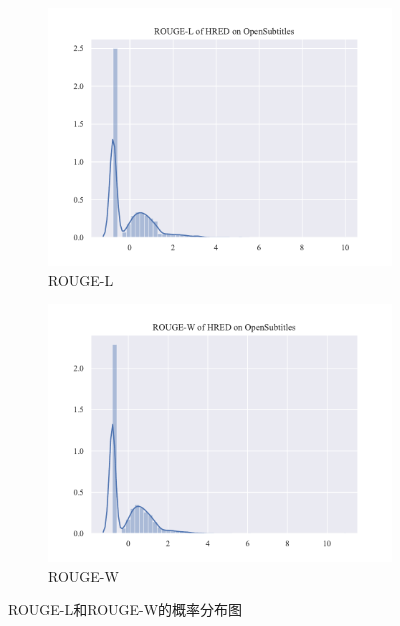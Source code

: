\begin{figure}[H]
    \begin{subfigure}{0.5\linewidth}
        \centering
        \includegraphics[width=\linewidth]{figure/distplot/opensub/hred/rouge_l/plot.pdf}
        \caption{ROUGE-L}
    \end{subfigure}%
    \begin{subfigure}{0.5\linewidth}
        \centering
        \includegraphics[width=\linewidth]{figure/distplot/opensub/hred/rouge_w/plot.pdf}
        \caption{ROUGE-W}
    \end{subfigure}
    \centering
    \caption{ROUGE-L和ROUGE-W的概率分布图}
    \label{fig:ROUGE_LW_dist}
\end{figure}
